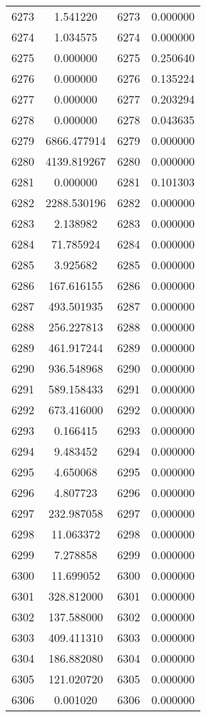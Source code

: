 \documentclass[12pt]{article}
\begin{document}
\begin{longtable}{@{}cccc@{}}
6273 & 1.541220 & 6273 & 0.000000 \\
6274 & 1.034575 & 6274 & 0.000000 \\
6275 & 0.000000 & 6275 & 0.250640 \\
6276 & 0.000000 & 6276 & 0.135224 \\
6277 & 0.000000 & 6277 & 0.203294 \\
6278 & 0.000000 & 6278 & 0.043635 \\
6279 & 6866.477914 & 6279 & 0.000000 \\
6280 & 4139.819267 & 6280 & 0.000000 \\
6281 & 0.000000 & 6281 & 0.101303 \\
6282 & 2288.530196 & 6282 & 0.000000 \\
6283 & 2.138982 & 6283 & 0.000000 \\
6284 & 71.785924 & 6284 & 0.000000 \\
6285 & 3.925682 & 6285 & 0.000000 \\
6286 & 167.616155 & 6286 & 0.000000 \\
6287 & 493.501935 & 6287 & 0.000000 \\
6288 & 256.227813 & 6288 & 0.000000 \\
6289 & 461.917244 & 6289 & 0.000000 \\
6290 & 936.548968 & 6290 & 0.000000 \\
6291 & 589.158433 & 6291 & 0.000000 \\
6292 & 673.416000 & 6292 & 0.000000 \\
6293 & 0.166415 & 6293 & 0.000000 \\
6294 & 9.483452 & 6294 & 0.000000 \\
6295 & 4.650068 & 6295 & 0.000000 \\
6296 & 4.807723 & 6296 & 0.000000 \\
6297 & 232.987058 & 6297 & 0.000000 \\
6298 & 11.063372 & 6298 & 0.000000 \\
6299 & 7.278858 & 6299 & 0.000000 \\
6300 & 11.699052 & 6300 & 0.000000 \\
6301 & 328.812000 & 6301 & 0.000000 \\
6302 & 137.588000 & 6302 & 0.000000 \\
6303 & 409.411310 & 6303 & 0.000000 \\
6304 & 186.882080 & 6304 & 0.000000 \\
6305 & 121.020720 & 6305 & 0.000000 \\
6306 & 0.001020 & 6306 & 0.000000 \\

\end{longtable}
\end{document}
